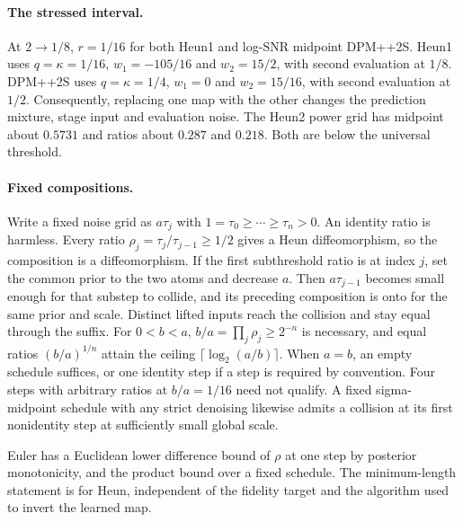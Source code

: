 \documentclass[10pt,twocolumn,letterpaper]{article}
\begin{document}
\paragraph{The stressed interval.}
At $2\to1/8$, $r=1/16$ for both Heun1 and log-SNR midpoint DPM++2S. Heun1 uses $q=\kappa=1/16$, $w_1=-105/16$ and $w_2=15/2$, with second evaluation at $1/8$. DPM++2S uses $q=\kappa=1/4$, $w_1=0$ and $w_2=15/16$, with second evaluation at $1/2$. Consequently, replacing one map with the other changes the prediction mixture, stage input and evaluation noise. The Heun2 power grid has midpoint about $0.5731$ and ratios about $0.287$ and $0.218$. Both are below the universal threshold.

\paragraph{Fixed compositions.}
Write a fixed noise grid as $a\tau_j$ with $1=\tau_0\ge\cdots\ge\tau_n>0$. An identity ratio is harmless. Every ratio $\rho_j=\tau_j/\tau_{j-1}\ge1/2$ gives a Heun diffeomorphism, so the composition is a diffeomorphism. If the first subthreshold ratio is at index $j$, set the common prior to the two atoms and decrease $a$. Then $a\tau_{j-1}$ becomes small enough for that substep to collide, and its preceding composition is onto for the same prior and scale. Distinct lifted inputs reach the collision and stay equal through the suffix. For $0<b<a$, $b/a=\prod_j\rho_j\ge2^{-n}$ is necessary, and equal ratios $(b/a)^{1/n}$ attain the ceiling $\lceil\log_2(a/b)\rceil$. When $a=b$, an empty schedule suffices, or one identity step if a step is required by convention. Four steps with arbitrary ratios at $b/a=1/16$ need not qualify. A fixed sigma-midpoint schedule with any strict denoising likewise admits a collision at its first nonidentity step at sufficiently small global scale.

Euler has a Euclidean lower difference bound of $\rho$ at one step by posterior monotonicity, and the product bound over a fixed schedule. The minimum-length statement is for Heun, independent of the fidelity target and the algorithm used to invert the learned map.
\end{document}

